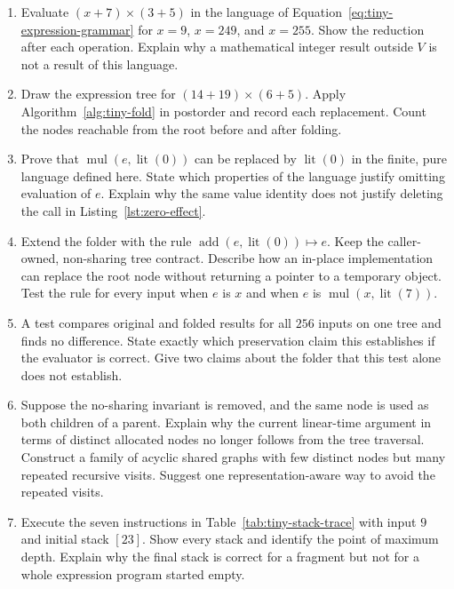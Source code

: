 \begin{enumerate}
  \item \label{ex:tiny-wraparound}
  Evaluate $(x+7)\times(3+5)$ in the language of Equation~\ref{eq:tiny-expression-grammar} for $x=9$, $x=249$, and $x=255$.
  Show the reduction after each operation.
  Explain why a mathematical integer result outside $V$ is not a result of this language.

  \item \label{ex:tiny-nested-fold}
  Draw the expression tree for $(14+19)\times(6+5)$.
  Apply Algorithm~\ref{alg:tiny-fold} in postorder and record each replacement.
  Count the nodes reachable from the root before and after folding.

  \item \label{ex:tiny-zero-identity}
  Prove that $\operatorname{mul}(e,\operatorname{lit}(0))$ can be replaced by $\operatorname{lit}(0)$ in the finite, pure language defined here.
  State which properties of the language justify omitting evaluation of $e$.
  Explain why the same value identity does not justify deleting the call in Listing~\ref{lst:zero-effect}.

  \item \label{ex:tiny-identity-extension}
  Extend the folder with the rule $\operatorname{add}(e,\operatorname{lit}(0))\mapsto e$.
  Keep the caller-owned, non-sharing tree contract.
  Describe how an in-place implementation can replace the root node without returning a pointer to a temporary object.
  Test the rule for every input when $e$ is $x$ and when $e$ is $\operatorname{mul}(x,\operatorname{lit}(7))$.

  \item \label{ex:tiny-test-limits}
  A test compares original and folded results for all $256$ inputs on one tree and finds no difference.
  State exactly which preservation claim this establishes if the evaluator is correct.
  Give two claims about the folder that this test alone does not establish.

  \item \label{ex:tiny-shared-node}
  Suppose the no-sharing invariant is removed, and the same node is used as both children of a parent.
  Explain why the current linear-time argument in terms of distinct allocated nodes no longer follows from the tree traversal.
  Construct a family of acyclic shared graphs with few distinct nodes but many repeated recursive visits.
  Suggest one representation-aware way to avoid the repeated visits.
  \item \label{ex:tiny-stack-prefix}
  Execute the seven instructions in Table~\ref{tab:tiny-stack-trace} with input $9$ and initial stack $[23]$.
  Show every stack and identify the point of maximum depth.
  Explain why the final stack is correct for a fragment but not for a whole expression program started empty.


\end{enumerate}
